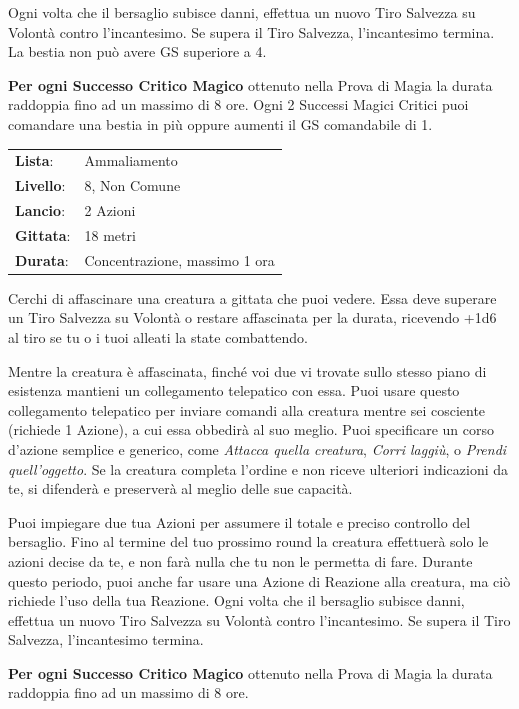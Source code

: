 \begin{multicols}{2}
Ogni volta che il bersaglio subisce danni, effettua un nuovo Tiro Salvezza su Volontà contro l'incantesimo. Se supera il Tiro Salvezza, l'incantesimo termina. La bestia non può avere GS superiore a 4.

\textbf{Per ogni Successo Critico Magico} ottenuto nella Prova di Magia la durata raddoppia fino ad un massimo di 8 ore. Ogni 2 Successi Magici Critici puoi comandare una bestia in più oppure aumenti il GS comandabile di 1.

\noindent\begin{tabularx}{\linewidth}{p{1.3cm}X}
	\rowcolor{gray!20}\textbf{Lista}: & Ammaliamento \\
	\textbf{Livello}: & 8, Non Comune \\
	\rowcolor{gray!20}\textbf{Lancio}: & 2 Azioni \\
	\textbf{Gittata}: & 18 metri \\
	\rowcolor{gray!20}\textbf{Durata}: & Concentrazione, massimo 1 ora \\
\end{tabularx}\smallskip

Cerchi di affascinare una creatura a gittata che puoi vedere. Essa deve superare un Tiro Salvezza su Volontà o restare affascinata per la durata, ricevendo +1d6 al tiro se tu o i tuoi alleati la state combattendo.

Mentre la creatura è affascinata, finché voi due vi trovate sullo stesso piano di esistenza mantieni un collegamento telepatico con essa. Puoi usare questo collegamento telepatico per inviare comandi alla creatura mentre sei cosciente (richiede 1 Azione), a cui essa obbedirà al suo meglio. Puoi specificare un corso d'azione semplice e generico, come \emph{Attacca quella creatura}, \emph{Corri laggiù}, o \emph{Prendi quell'oggetto}. Se la creatura completa l'ordine e non riceve ulteriori indicazioni da te, si difenderà e preserverà al meglio delle sue capacità.

Puoi impiegare due tua Azioni per assumere il totale e preciso controllo del bersaglio. Fino al termine del tuo prossimo round la creatura effettuerà solo le azioni decise da te, e non farà nulla che tu non le permetta di fare. Durante questo periodo, puoi anche far usare una Azione di Reazione alla creatura, ma ciò richiede l'uso della tua Reazione. Ogni volta che il bersaglio subisce danni, effettua un nuovo Tiro Salvezza su Volontà contro l'incantesimo. Se supera il Tiro Salvezza, l'incantesimo termina.

\textbf{Per ogni Successo Critico Magico} ottenuto nella Prova di Magia la durata raddoppia fino ad un massimo di 8 ore.


\end{multicols}
